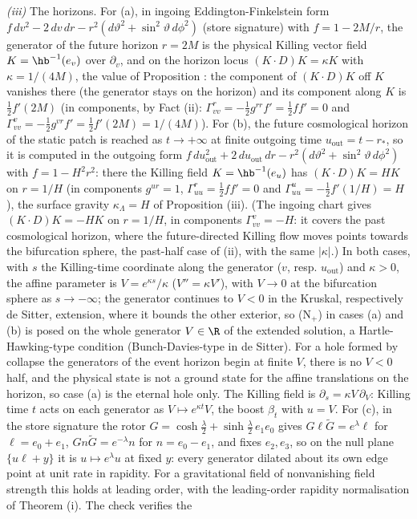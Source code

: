 \emph{(iii)} The horizons. For (a), in ingoing Eddington-Finkelstein form $f\,dv^{2} - 2\,dv\,dr - r^{2}(d\vartheta^{2} + \sin^{2}\vartheta\,d\phi^{2})$ (store signature) with $f = 1 - 2M/r$, the generator of the future horizon $r = 2M$ is the physical Killing vector field $K = \hb^{-1}(e_{v})$ over $\partial_{v}$, and on the horizon locus $(K \cdot D)K = \kappa K$ with $\kappa = 1/(4M)$, the value of Proposition : the component of $(K \cdot D)K$ off $K$ vanishes there (the generator stays on the horizon) and its component along $K$ is $\tfrac12 f'(2M)$ (in components, by Fact (ii): $\Gamma^{r}_{vv} = -\tfrac12 g^{rr}f' = \tfrac12 ff' = 0$ and $\Gamma^{v}_{vv} = -\tfrac12 g^{vr}f' = \tfrac12 f'(2M) = 1/(4M)$). For (b), the future cosmological horizon of the static patch is reached as $t \to +\infty$ at finite outgoing time $u_{\mathrm{out}} = t - r_{*}$, so it is computed in the outgoing form $f\,du_{\mathrm{out}}^{2} + 2\,du_{\mathrm{out}}\,dr - r^{2}(d\vartheta^{2} + \sin^{2}\vartheta\,d\phi^{2})$ with $f = 1 - H^{2}r^{2}$: there the Killing field $K = \hb^{-1}(e_{u})$ has $(K \cdot D)K = HK$ on $r = 1/H$ (in components $g^{ur} = 1$, $\Gamma^{r}_{uu} = \tfrac12 ff' = 0$ and $\Gamma^{u}_{uu} = -\tfrac12 f'(1/H) = H$), the surface gravity $\kappa_{\Lambda} = H$ of Proposition (iii). (The ingoing chart gives $(K \cdot D)K = -HK$ on $r = 1/H$, in components $\Gamma^{v}_{vv} = -H$: it covers the past cosmological horizon, where the future-directed Killing flow moves points towards the bifurcation sphere, the past-half case of (ii), with the same $|\kappa|$.) In both cases, with $s$ the Killing-time coordinate along the generator ($v$, resp. $u_{\mathrm{out}}$) and $\kappa > 0$, the affine parameter is $V = e^{\kappa s}/\kappa$ ($V'' = \kappa V'$), with $V \to 0$ at the bifurcation sphere as $s \to -\infty$; the generator continues to $V < 0$ in the Kruskal, respectively de Sitter, extension, where it bounds the other exterior, so (N$_{+}$) in cases (a) and (b) is posed on the whole generator $V \in \R$ of the extended solution, a Hartle-Hawking-type condition (Bunch-Davies-type in de Sitter). For a hole formed by collapse the generators of the event horizon begin at finite $V$, there is no $V < 0$ half, and the physical state is not a ground state for the affine translations on the horizon, so case (a) is the eternal hole only. The Killing field is $\partial_{s} = \kappa V\,\partial_{V}$: Killing time $t$ acts on each generator as $V \mapsto e^{\kappa t}V$, the boost $\beta_{t}$ with $u = V$. For (c), in the store signature the rotor $G = \cosh\tfrac{\lambda}{2} + \sinh\tfrac{\lambda}{2}\,e_{1}e_{0}$ gives $G\ell\tilde G = e^{\lambda}\ell$ for $\ell = e_{0} + e_{1}$, $Gn\tilde G = e^{-\lambda}n$ for $n = e_{0} - e_{1}$, and fixes $e_{2}, e_{3}$, so on the null plane $\{u\ell + y\}$ it is $u \mapsto e^{\lambda}u$ at fixed $y$: every generator dilated about its own edge point at unit rate in rapidity. For a gravitational field of nonvanishing field strength this holds at leading order, with the leading-order rapidity normalisation of Theorem (i). The check verifies the 